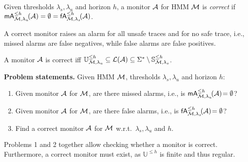\documentclass[runningheads]{llncs}
\newcommand{\safetraces}[2]{\mathbb{S}_{#1}^{#2}}
\newcommand{\unsafetraces}[2]{\mathbb{U}_{#1}^{#2}}
\newcommand{\missedalarms}[2]{\mathsf{mA}_{#1}^{#2}}
\newcommand{\falsealarms}[2]{\mathsf{fA}_{#1}^{#2}}
\begin{document}
\begin{definition}\label{def:cormon}
    Given thresholds $\lambda_s,\lambda_u$ and horizon $h$, a monitor $\mathcal{A}$ for HMM $\mathcal{M}$ is \emph{correct} if $\missedalarms{\mc,\lambda_u}{\leq h}\!(\dfa) = \emptyset = \falsealarms{\mc,\lambda_s}{\leq h}\!(\dfa)$.
\end{definition}
A correct monitor raises an alarm for all unsafe traces and for no safe trace, i.e., missed alarms are false negatives, while false alarms are false positives.
\begin{corollary}%
    A monitor $\mathcal{A}$ is correct iff $ \unsafetraces{\mc,\lambda_u}{\leq h} \subseteq \lang{\dfa} \subseteq \alphabet^* \setminus \safetraces{\mc, \lambda_s}{\leq h}$.%
\end{corollary}
\begin{mdframed}\textbf{Problem statements.} %
    Given HMM $\mathcal{M}$, thresholds $\lambda_s,\lambda_u$ and horizon $h$:
    \begin{enumerate}[topsep=2pt]
        \item\label{prob:MA} Given monitor $\mathcal{A}$ for $\mathcal{M}$, are there  missed alarms, i.e., is $\missedalarms{\mc,\lambda_u}{\leq h}\!(\dfa)\! = \emptyset$?
        \item\label{prob:FA} Given monitor $\mathcal{A}$ for $\mathcal{M}$, are there false alarms, i.e., is $\falsealarms{\mc,\lambda_s}{\leq h}\!(\dfa)\! = \emptyset$?
        \item\label{prob:Learn} Find a correct monitor $\mathcal{A}$ for $\mathcal{M}$ w.r.t.\ $\lambda_s, \lambda_u$ and $h$.
    \end{enumerate}
\end{mdframed}
Problems 1 and 2 together allow checking whether a monitor is correct.
Furthermore, a correct monitor must exist, as $\unsafetraces{}{\leq h}$ is finite and thus regular.
\end{document}
